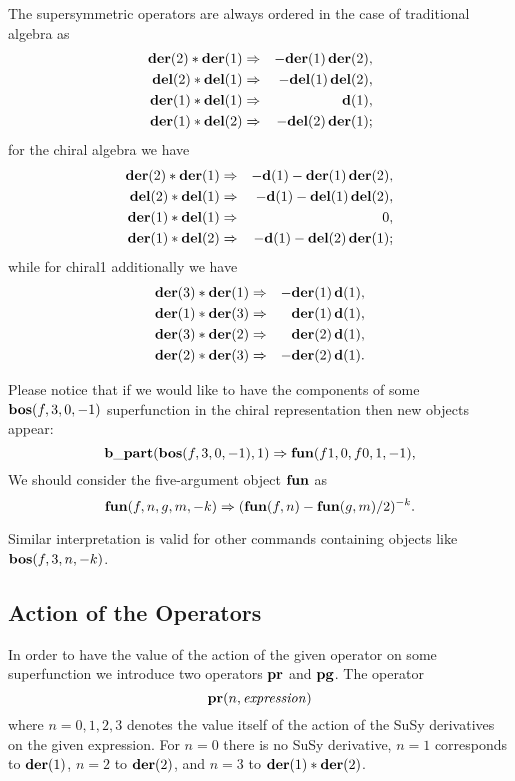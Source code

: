 {The supersymmetric operators are always ordered in the case of
traditional algebra as
\begin{eqnarray*}
  \mathbf{der}(2)*\mathbf{der}(1) &\Rightarrow& -\mathbf{der}(1)\,\mathbf{der}(2),\\
  \mathbf{del}(2)*\mathbf{del}(1) &\Rightarrow& -\mathbf{del}(1)\,\mathbf{del}(2), \\
  \mathbf{der}(1)*\mathbf{del}(1) &\Rightarrow& \mathbf{d}(1), \\
  \mathbf{der}(1)*\mathbf{del}(2) &\Rightarrow& -\mathbf{del}(2)\,\mathbf{der}(1);
\end{eqnarray*}
for the chiral algebra we have
\begin{eqnarray*}
  \mathbf{der}(2)*\mathbf{der}(1) &\Rightarrow& -\mathbf{d}(1) - \mathbf{der}(1)\,\mathbf{der}(2),\\
  \mathbf{del}(2)*\mathbf{del}(1) &\Rightarrow& -\mathbf{d}(1) - \mathbf{del}(1)\,\mathbf{del}(2), \\
  \mathbf{der}(1)*\mathbf{del}(1) &\Rightarrow& 0, \\
  \mathbf{der}(1)*\mathbf{del}(2) &\Rightarrow& -\mathbf{d}(1) - \mathbf{del}(2)\,\mathbf{der}(1);
\end{eqnarray*}
while for chiral1 additionally we have
\begin{eqnarray*}
  \mathbf{der}(3)*\mathbf{der}(1) &\Rightarrow& -\mathbf{der}(1)\,\mathbf{d}(1), \\
  \mathbf{der}(1)*\mathbf{der}(3) &\Rightarrow& \mathbf{der}(1)\,\mathbf{d}(1), \\
  \mathbf{der}(3)*\mathbf{der}(2) &\Rightarrow& \mathbf{der}(2)\,\mathbf{d}(1), \\
  \mathbf{der}(2)*\mathbf{der}(3) &\Rightarrow& -\mathbf{der}(2)\,\mathbf{d}(1).
\end{eqnarray*}

Please notice that if we would like to have the components of some
$\mathbf{bos}(f,3,0,-1)$ superfunction in the chiral representation then new
objects appear:
\begin{equation*}
  \mathbf{b\_part}(\mathbf{bos}(f,3,0,-1), 1)  \Rightarrow \mathbf{fun}(f1,0,f0,1,-1),
\end{equation*}
We should consider the five-argument object $\mathbf{fun}$ as
\begin{equation*}
  \mathbf{fun}(f,n,g,m,-k) \Rightarrow (\mathbf{fun}(f,n)-\mathbf{fun}(g,m)/2)^{-k}.
\end{equation*}
\begin{sloppypar}
  Similar interpretation is valid for other commands containing
  objects like $\mathbf{bos}(f,3,n,-k)$.
\end{sloppypar}

\subsection{Action of the Operators}

In order to have the value of the action of the given operator on some
superfunction we introduce two operators $\mathbf{pr}$ and $\mathbf{pg}$.  The
operator
\begin{equation*}
  \mathbf{pr}(n,\mathit{expression})
\end{equation*}
where $n=0,1,2,3$ denotes the value itself of the action of the SuSy
derivatives on the given expression.  For $n=0$ there is no SuSy
derivative, $n=1$ corresponds to $\mathbf{der}(1)$, $n=2$ to $\mathbf{der}(2)$, and
$n=3$ to $\mathbf{der}(1)*\mathbf{der}(2)$.

}
